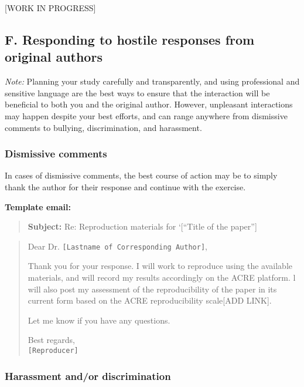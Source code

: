 \documentclass[]{book}
\begin{document}
{[}WORK IN PROGRESS{]}

\hypertarget{f.-responding-to-hostile-responses-from-original-authors}{%
\subsection{F. Responding to hostile responses from original authors}\label{f.-responding-to-hostile-responses-from-original-authors}}

\emph{Note:} Planning your study carefully and transparently, and using professional and sensitive language are the best ways to ensure that the interaction will be beneficial to both you and the original author. However, unpleasant interactions may happen despite your best efforts, and can range anywhere from dismissive comments to bullying, discrimination, and harassment.

\hypertarget{dismissive-comments}{%
\subsubsection{Dismissive comments}\label{dismissive-comments}}

In cases of dismissive comments, the best course of action may be to simply thank the author for their response and continue with the exercise.

\textbf{Template email:}

\begin{quote}
\textbf{Subject:} Re: Reproduction materials for `{[}``Title of the paper''{]}
\end{quote}

\begin{quote}
Dear Dr. \texttt{{[}Lastname\ of\ Corresponding\ Author{]}},

Thank you for your response. I will work to reproduce using the available materials, and will record my results accordingly on the ACRE platform. l will also post my assessment of the reproducibility of the paper in its current form based on the ACRE reproducibility scale{[}ADD LINK{]}.

Let me know if you have any questions.

Best regards,\\
\texttt{{[}Reproducer{]}}
\end{quote}

\hypertarget{harassment-andor-discrimination}{%
\subsubsection{Harassment and/or discrimination}\label{harassment-andor-discrimination}}
\end{document}
